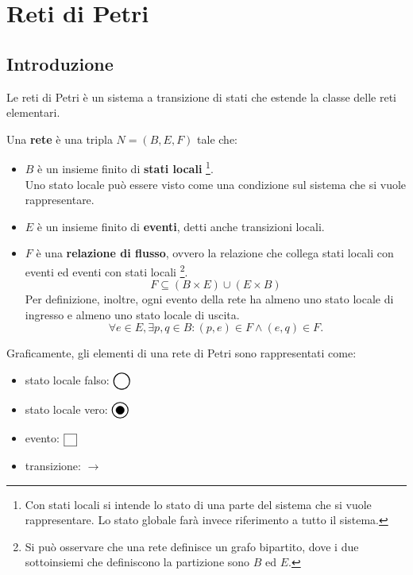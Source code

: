 \chapter{Reti di Petri}
\section{Introduzione}
Le reti di Petri è un sistema a transizione di stati che estende la classe delle reti elementari.
\begin{defn}
    Una \textbf{rete} è una tripla $N = (B, E, F)$ tale che:
    \begin{itemize}
        \item $B$ è un insieme finito di \textbf{stati locali} \footnote{Con stati locali si intende lo stato di una parte del sistema che si vuole rappresentare. Lo stato globale farà invece riferimento a tutto il sistema.}.\\
        Uno stato locale può essere visto come una condizione sul sistema che si vuole rappresentare.
        \item $E$ è un insieme finito di \textbf{eventi}, detti anche transizioni locali.
        \item $F$ è una \textbf{relazione di flusso}, ovvero la relazione che collega stati locali con eventi ed eventi con stati locali \footnote{Si può osservare che una rete definisce un grafo bipartito, dove i due sottoinsiemi che definiscono la partizione sono $B$ ed $E$.}.
        \[
            F \subseteq (B \times E) \cup (E \times B)
        \]
        Per definizione, inoltre, ogni evento della rete ha almeno uno stato locale di ingresso e almeno uno stato locale di uscita.
        \[
            \forall e \in E, \exists p, q \in B : (p, e) \in F \land (e, q) \in F.
        \]
    \end{itemize}
\end{defn}

Graficamente, gli elementi di una rete di Petri sono rappresentati come:
\begin{itemize}
    \item stato locale falso: $\fPlace$
    \item stato locale vero: $\tPlace$
    \item evento: $\event$
    \item transizione: $\longrightarrow$
\end{itemize}

